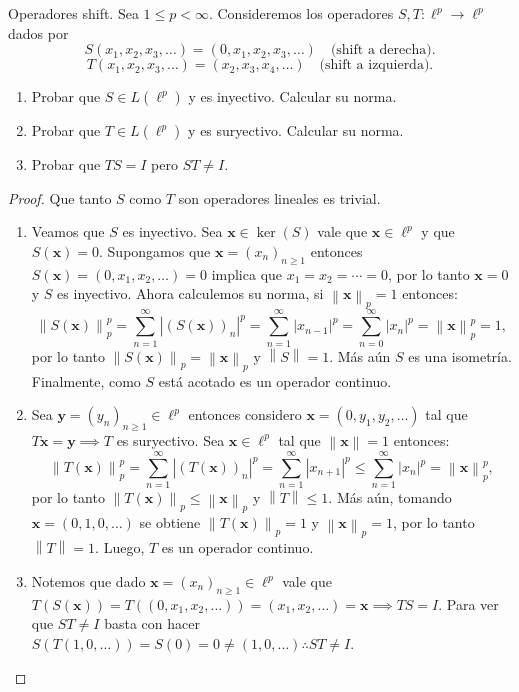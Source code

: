 \documentclass{article}
\theoremstyle{definition}
\newcommand{\norm}[1]{\left\lVert #1 \right\rVert}       %
\newenvironment{ejercicio}[1]{\begin{trivlist}
\item[\hskip \labelsep {\bfseries Ejercicio}\hskip \labelsep {\bfseries #1.}]}{\end{trivlist}}
\begin{document}
\begin{ejercicio}{9}
    Operadores shift. Sea \( 1\leq p < \infty \). Consideremos los operadores \( S,T : \ell^p \to \ell^p \) dados por
    \[
        S(x_1,x_2,x_3,\dots)=(0,x_1,x_2,x_3,\dots) \quad \text{(shift a derecha)}.
    \]
    \[
        T(x_1,x_2,x_3,\dots)=(x_2,x_3,x_4,\dots) \quad \text{(shift a izquierda)}.
    \]
    \begin{enumerate}
        \item Probar que \(S\in L(\ell^p)\) y es inyectivo. Calcular su norma.
        \item Probar que \(T\in L(\ell^p)\) y es suryectivo. Calcular su norma.
        \item Probar que \(TS=I\) pero \(ST\neq I\).
    \end{enumerate}
\end{ejercicio}
\begin{proof}
    Que tanto \( S \) como \( T \) son operadores lineales es trivial.\begin{enumerate}
        \item Veamos que \( S \) es inyectivo. Sea \( \mathbf{x} \in \ker(S) \) vale que \( \mathbf{x} \in \ell^p \) y que \( S(\mathbf{x}) = 0 \). Supongamos que \( \mathbf{x} = {(x_n)}_{n \ge 1} \) entonces \( S(\mathbf{x}) = (0, x_1, x_2, \dots) = 0 \) implica que \( x_1 = x_2 = \cdots = 0 \), por lo tanto \( \mathbf{x} = 0 \) y \( S \) es inyectivo. Ahora calculemos su norma, si \( \norm{\mathbf{x}}_p = 1 \) entonces:
              \[
                  \norm{S(\mathbf{x})}_p^p = \sum_{n=1}^{\infty} |{(S(\mathbf{x}))}_n|^p = \sum_{n=1}^{\infty} |x_{n-1}|^p = \sum_{n=0}^{\infty} |x_n|^p = \norm{\mathbf{x}}_p^p = 1,
              \]
              por lo tanto \( \norm{S(\mathbf{x})}_p = \norm{\mathbf{x}}_p \) y \(\norm{S} = 1\). Más aún \( S \) es una isometría. Finalmente, como \( S \) está acotado es un operador continuo.
        \item Sea \( \mathbf{y} = {(y_n)}_{n \ge 1} \in \ell^p \) entonces considero \( \mathbf{x} = (0, y_1, y_2, \ldots) \) tal que \( T\mathbf{x} = \mathbf{y} \implies T \) es suryectivo. Sea \( \mathbf{x} \in \ell^p \) tal que \( \norm{\mathbf{x}} = 1 \) entonces:
              \[
                  \norm{T(\mathbf{x})}_p^p = \sum_{n=1}^{\infty} |{(T(\mathbf{x}))}_n|^p = \sum_{n=1}^{\infty} |x_{n+1}|^p \le \sum_{n=1}^{\infty} |x_n|^p = \norm{\mathbf{x}}_p^p,
              \]
              por lo tanto \( \norm{T(\mathbf{x})}_p \le \norm{\mathbf{x}}_p \) y \(\norm{T} \le 1\). Más aún, tomando \( \mathbf{x} = (0, 1,0,\dots) \) se obtiene \( \norm{T(\mathbf{x})}_p = 1 \) y \( \norm{\mathbf{x}}_p = 1 \), por lo tanto \( \norm{T} = 1 \). Luego, \( T \) es un operador continuo.
        \item Notemos que dado \( \mathbf{x} = {(x_n)}_{n\ge1} \in \ell^p \) vale que \( T(S(\mathbf{x})) = T((0, x_1, x_2, \ldots)) = (x_1, x_2, \ldots) = \mathbf{x} \implies TS = I \). Para ver que \( ST \neq I \) basta con hacer \( S(T(1,0,\ldots)) = S(0) = 0 \neq (1, 0, \ldots) \therefore ST \neq I \).
    \end{enumerate}
\end{proof}
\end{document}
